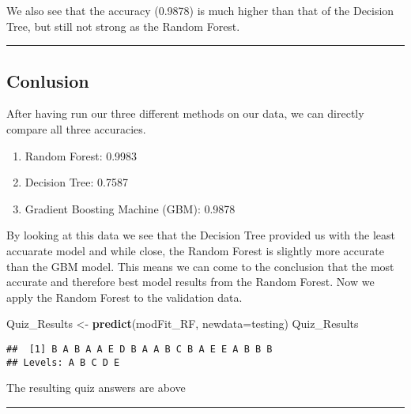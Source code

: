 \documentclass[]{article}
\newenvironment{Shaded}{\begin{snugshade}}{\end{snugshade}}
\newcommand{\KeywordTok}[1]{\textcolor[rgb]{0.13,0.29,0.53}{\textbf{#1}}}
\newcommand{\DataTypeTok}[1]{\textcolor[rgb]{0.13,0.29,0.53}{#1}}
\newcommand{\StringTok}[1]{\textcolor[rgb]{0.31,0.60,0.02}{#1}}
\newcommand{\NormalTok}[1]{#1}
\providecommand{\tightlist}{%
  \setlength{\itemsep}{0pt}\setlength{\parskip}{0pt}}
\begin{document}
We also see that the accuracy (0.9878) is much higher than that of the
Decision Tree, but still not strong as the Random Forest.

\begin{center}\rule{0.5\linewidth}{\linethickness}\end{center}

\subsection{Conlusion}\label{conlusion}

After having run our three different methods on our data, we can
directly compare all three accuracies.

\begin{enumerate}
\def\labelenumi{\arabic{enumi})}
\tightlist
\item
  Random Forest: 0.9983
\item
  Decision Tree: 0.7587
\item
  Gradient Boosting Machine (GBM): 0.9878
\end{enumerate}

By looking at this data we see that the Decision Tree provided us with
the least accuarate model and while close, the Random Forest is slightly
more accurate than the GBM model. This means we can come to the
conclusion that the most accurate and therefore best model results from
the Random Forest. Now we apply the Random Forest to the validation
data.

\begin{Shaded}
\begin{Highlighting}[]
\NormalTok{Quiz_Results <-}\StringTok{ }\KeywordTok{predict}\NormalTok{(modFit_RF, }\DataTypeTok{newdata=}\NormalTok{testing)}
\NormalTok{Quiz_Results}
\end{Highlighting}
\end{Shaded}

\begin{verbatim}
##  [1] B A B A A E D B A A B C B A E E A B B B
## Levels: A B C D E
\end{verbatim}

The resulting quiz answers are above

\begin{center}\rule{0.5\linewidth}{\linethickness}\end{center}
\end{document}
